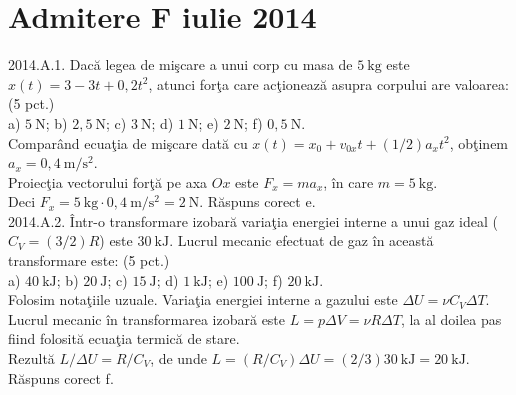 
\section{Admitere F iulie 2014}

2014.A.1. Dacă legea de mişcare a unui corp cu masa de $5 \mathrm{~kg}$ este $x(t)=3-3 t+0,2 t^{2}$, atunci forţa care acţionează asupra corpului are valoarea: (5 pct.)\\ a) $5 \mathrm{~N}$; b) $2,5 \mathrm{~N}$; c) $3 \mathrm{~N}$; d) $1 \mathrm{~N}$; e) $2 \mathrm{~N}$; f) $0,5 \mathrm{~N}$.\\ Comparând ecuaţia de mişcare dată cu $x(t)=x_{0}+v_{0 x} t+(1 / 2) a_{x} t^{2}$, obţinem $a_{x}=0,4 \mathrm{~m} / \mathrm{s}^{2}$.\\ Proiecţia vectorului forţă pe axa $O x$ este $F_{x}=m a_{x}$, în care $m=5 \mathrm{~kg}$.\\ Deci $F_{x}=5 \mathrm{~kg} \cdot 0,4 \mathrm{~m} / \mathrm{s}^{2}=2 \mathrm{~N}$. Răspuns corect e.\\

2014.A.2. Într-o transformare izobară variaţia energiei interne a unui gaz ideal ($C_{V}=(3 / 2) R$) este $30 \mathrm{~kJ}$. Lucrul mecanic efectuat de gaz în această transformare este: (5 pct.)\\ a) $40 \mathrm{~kJ}$; b) $20 \mathrm{~J}$; c) $15 \mathrm{~J}$; d) $1 \mathrm{~kJ}$; e) $100 \mathrm{~J}$; f) $20 \mathrm{~kJ}$.\\ Folosim notaţiile uzuale. Variaţia energiei interne a gazului este $\Delta U=\nu C_{V} \Delta T$. Lucrul mecanic în transformarea izobară este $L=p \Delta V=\nu R \Delta T$, la al doilea pas fiind folosită ecuaţia termică de stare.\\ Rezultă $L / \Delta U=R / C_{V}$, de unde $L=\left(R / C_{V}\right) \Delta U=(2 / 3) 30 \mathrm{~kJ}=20 \mathrm{~kJ}$. Răspuns corect f.\\

